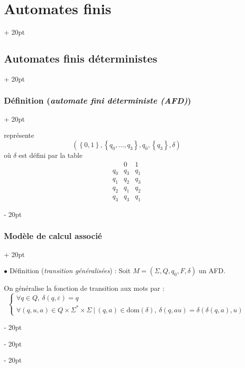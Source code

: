 \documentclass[a4paper, 12pt, twoside]{article}
\newcommand{\set}[1]{\left\{ #1 \right\}}
\newcommand{\ind}[1][20pt]{\advance\leftskip + #1}
\newcommand{\deind}[1][20pt]{\advance\leftskip - #1}
\newenvironment{indt}[2][20pt]{#2 \par \ind[#1]}{\par \deind} %
\begin{document}
\begin{indt}{\section{Automates finis}}
\begin{indt}{\subsection{Automates finis déterministes}}
\begin{indt}{\subsubsection{Définition (\textit{automate fini déterministe (AFD)})}}
\begin{center}
                \end{center}

                représente
                \[
                    (\set{0, 1}, \set{q_0, \ldots, q_3}, q_0, \set{q_3}, \delta)
                \]
                où $\delta$ est défini par la table
                \[
                    \begin{array}{c|c|c}
                        & 0 & 1
                        \\
                        \hline
                        q_0 & q_3 & q_1
                        \\
                        \hline
                        q_1 & q_2 & q_3
                        \\
                        \hline
                        q_2 & q_ 1 & q_2
                        \\
                        \hline
                        q_3 & q_3 & q_1
                    \end{array}
                \]
            \end{indt}

            \vspace{12pt}
            
            \begin{indt}{\subsubsection{Modèle de calcul associé}}
                \label{2.1.3}

                $\bullet$ Définition (\emph{transition généralisées}) : Soit $M = (\Sigma, Q, q_0, F, \delta)$ un AFD.

                On généralise la fonction de transition aux mots par :
                \[
                    \begin{cases}
                        \forall q \in Q,\ \delta(q, \varepsilon) = q
                        \\
                        \forall (q, u, a) \in Q \times \Sigma^* \times \Sigma\ |\ (q, a) \in \mathrm{dom}(\delta),\ \delta(q, au) = \delta(\delta(q, a), u)
                    \end{cases}
                \]


\end{indt}
\end{indt}
\end{indt}
\end{document}
